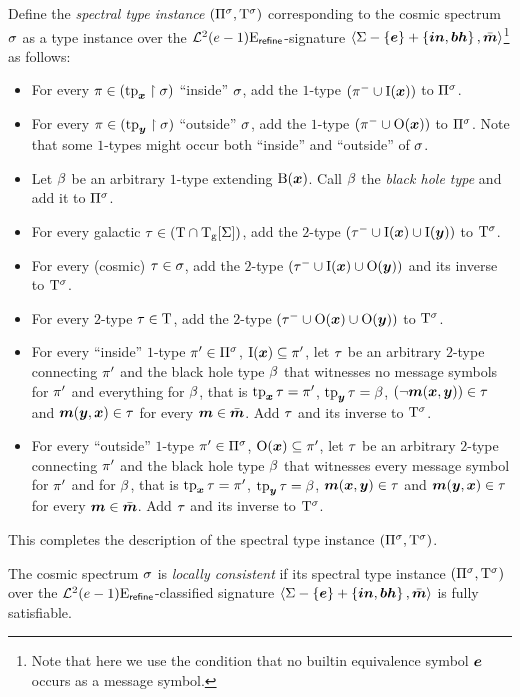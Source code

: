 \begin{definition}
Define the \emph{spectral type instance} $(\Pi^{\sigma},\mathrm{T}^{\sigma})$
corresponding to the cosmic spectrum $\sigma$ as a type instance over
the $\mathcal{L}^{2}_{{}}{(e-1)}\mathrm{E}_{\mathsf{refine}}$-signature 
$\left\langle \mathrm{\Sigma} - \left\{\bm{e}\right\} + \left\{\bm{in},\bm{bh}\right\},\bar{\bm{m}} \right\rangle$\footnote{Note that here we use
the condition that no builtin equivalence symbol $\bm{e}$ occurs as a message
symbol.} as follows:
\begin{itemize}
  \item[\sticondI]\label{sti-I}
  For every $\pi \in (\operatorname{tp}_{\bm{x}}\restriction\sigma)$ ``inside'' $\sigma$, add the
  $1$-type $(\pi^{-} \cup \mathrm{I}(\bm{x}))$ to $\Pi^{\sigma}$.
  \item[\sticondO]\label{sti-O}
  For every $\pi \in (\operatorname{tp}_{\bm{y}}\restriction\sigma)$ ``outside'' $\sigma$, add the
  $1$-type $(\pi^{-} \cup \mathrm{O}(\bm{x}))$ to $\Pi^{\sigma}$. Note that some
  $1$-types might occur both ``inside'' and ``outside'' of $\sigma$.
  \item[\sticondB]\label{sti-B}
  Let $\beta$ be an arbitrary $1$-type extending $\mathrm{B}(\bm{x})$.
  Call $\beta$ the \emph{black hole type} and add it to $\Pi^{\sigma}$.
  \item[\sticondII]\label{sti-II}
  For every galactic $\tau \in (\mathrm{T} \cap \mathrm{T}_{\mathrm{g}}[\mathrm{\Sigma}])$, add the $2$-type
  $(\tau^{-} \cup \mathrm{I}(\bm{x}) \cup \mathrm{I}(\bm{y}))$ to $\mathrm{T}^{\sigma}$.
  \item[\sticondIO]\label{sti-IO}
  For every (cosmic) $\tau \in \sigma$, add the $2$-type
  $(\tau^{-} \cup \mathrm{I}(\bm{x}) \cup \mathrm{O}(\bm{y}))$ and its inverse to $\mathrm{T}^{\sigma}$.
  \item[\sticondOO]\label{sti-OO}
  For every $2$-type $\tau \in \mathrm{T}$, add the $2$-type
  $(\tau^{-} \cup \mathrm{O}(\bm{x}) \cup \mathrm{O}(\bm{y}))$ to $\mathrm{T}^{\sigma}$.
  \item[\sticondIB]\label{sti-IB} For every ``inside'' $1$-type ${\pi'} \in
  \Pi^{\sigma}$, $\mathrm{I}(\bm{x}) \subseteq {\pi'}$, let $\tau$ be an arbitrary
  $2$-type connecting ${\pi'}$ and the black hole type $\beta$ that witnesses no
  message symbols for ${\pi'}$ and everything for $\beta$, that is
  $\operatorname{tp}_{\bm{x}}\tau = {\pi'}$, $\operatorname{tp}_{\bm{y}}\tau = \beta$, $(\lnot\bm{m}(\bm{x},\bm{y})) \in \tau$ and
  $\bm{m}(\bm{y},\bm{x}) \in \tau$ for every $\bm{m} \in \bar{\bm{m}}$. Add $\tau$ and its inverse
  to $\mathrm{T}^{\sigma}$.
  \item[\sticondOB]\label{sti-OB} For every ``outside'' $1$-type ${\pi'} \in
  \Pi^{\sigma}$, $\mathrm{O}(\bm{x}) \subseteq {\pi'}$, let $\tau$ be an arbitrary
  $2$-type connecting ${\pi'}$ and the black hole type $\beta$ that witnesses
  every message symbol for ${\pi'}$ and for $\beta$, that is
  $\operatorname{tp}_{\bm{x}}\tau = {\pi'}$, $\operatorname{tp}_{\bm{y}}\tau = \beta$, $\bm{m}(\bm{x},\bm{y}) \in \tau$ and
  $\bm{m}(\bm{y},\bm{x}) \in \tau$ for every $\bm{m} \in \bar{\bm{m}}$. Add $\tau$ and its inverse
  to $\mathrm{T}^{\sigma}$.
\end{itemize}
This completes the description of the spectral type instance
$(\Pi^{\sigma},\mathrm{T}^{\sigma})$.

The cosmic spectrum $\sigma$ is \emph{locally consistent} if its spectral type
instance $(\Pi^{\sigma},\mathrm{T}^{\sigma})$ over the
$\mathcal{L}^{2}_{{}}{(e-1)}\mathrm{E}_{\mathsf{refine}}$-classified signature
$\left\langle \mathrm{\Sigma} - \left\{\bm{e}\right\} + \left\{\bm{in}, \bm{bh}\right\},\bar{\bm{m}} \right\rangle$ is fully satisfiable.
\end{definition}
